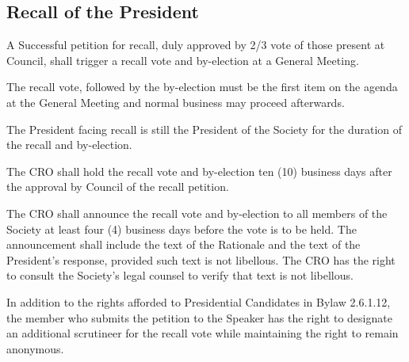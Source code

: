 \subsection{Recall of the President}
\begin{longenum}[ label*=\thesubsection.\arabic*., align=left]
	\item A Successful petition for recall, duly approved by 2/3 vote of those present at Council, shall trigger a recall vote and by-election at a General Meeting.
    \begin{longenum}[ label*=\arabic*., align=left]
		\item The recall vote, followed by the by-election must be the first item on the agenda at the General Meeting and normal business may proceed afterwards.
	\end{longenum}
	
    \item The President facing recall is still the President of the Society for the duration of the recall and by-election.
    \item The CRO shall hold the recall vote and by-election ten (10) business days after the approval by Council of the recall petition.
    \item The CRO shall announce the recall vote and by-election to all members of the Society at least four (4) business days before the vote is to be held. The announcement shall include the text of the Rationale and the text of the President's response, provided such text is not libellous. The CRO has the right to consult the Society's legal counsel to verify that text is not libellous.
    \item In addition to the rights afforded to Presidential Candidates in Bylaw 2.6.1.12, the member who submits the petition to the Speaker has the right to designate an additional scrutineer for the recall vote while maintaining the right to remain anonymous.
\end{longenum}
